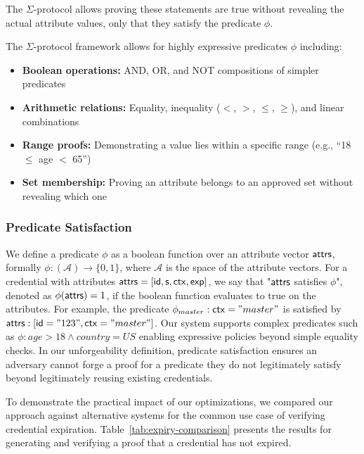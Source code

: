     The $\Sigma$-protocol allows proving these statements are true without revealing the actual attribute values, only that they satisfy the predicate $\phi$.

    The $\Sigma$-protocol framework allows for highly expressive predicates $\phi$ including:
    \begin{itemize}
    \item \textbf{Boolean operations:} AND, OR, and NOT compositions of simpler predicates
    \item \textbf{Arithmetic relations:} Equality, inequality ($<$, $>$, $\leq$, $\geq$), and linear combinations 
    \item \textbf{Range proofs:} Demonstrating a value lies within a specific range (e.g., ``18 $\leq$ age $<$ 65'')
    \item \textbf{Set membership:} Proving an attribute belongs to an approved set without revealing which one
    \end{itemize}

    

\subsubsection*{Predicate Satisfaction}
We define a predicate $\phi$ as a boolean function over an attribute vector $\mathsf{attrs}$, formally  $\phi: (\mathcal{A}) \rightarrow \{0,1\}$, where $\mathcal{A}$ is the space of the attribute vectors. 
For a credential with attributes $\mathsf{attrs} = [\mathsf{id}, \mathsf{s}, \mathsf{ctx}, \mathsf{exp}]$, we say that "$\mathsf{attrs}$ satisfies $\phi$", denoted as $\phi(\mathsf{attrs}) = 1$, if the boolean function evaluates to true on the attributes.
For example, the predicate $\phi_{master}:\mathsf{ctx} = "master"$ is satisfied by $\mathsf{attrs}: [\mathsf{id}="123", \mathsf{ctx}="master"]$. Our system supports complex predicates such as $\phi: age > 18 \wedge country = US$ enabling expressive policies beyond simple equality checks. In our unforgeability definition, predicate satisfaction ensures an adversary cannot forge a proof for a predicate they do not legitimately satisfy beyond legitimately reusing existing credentials.


To demonstrate the practical impact of our optimizations, we compared our approach against alternative systems for the common use case of verifying credential expiration. Table~\ref{tab:expiry-comparison} presents the results for generating and verifying a proof that a credential has not expired.



